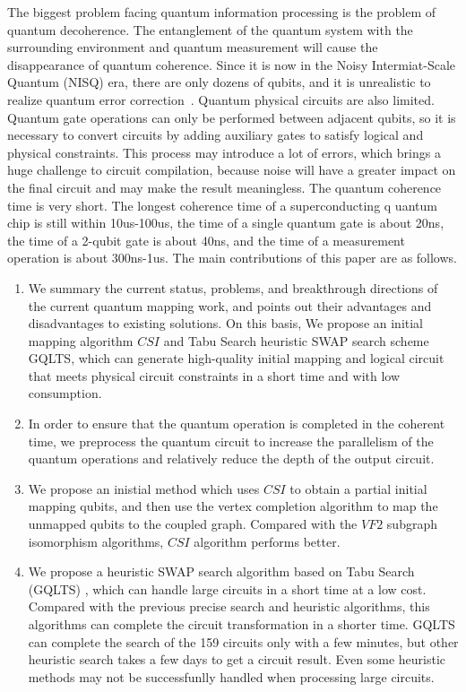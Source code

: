 \documentclass[runningheads]{llncs}
\begin{document}
The biggest problem facing quantum information processing is the problem of quantum decoherence.
The entanglement of the quantum system with the surrounding environment and quantum measurement 
will cause the disappearance of quantum coherence.
Since it is now in the Noisy Intermiat-Scale Quantum (NISQ) era, there are only dozens of qubits, 
and it is unrealistic to realize quantum error correction~\cite{2018QuantumPreskill}.
Quantum physical circuits are also limited. Quantum gate operations can only be performed between adjacent qubits, 
so it is necessary to convert circuits by adding auxiliary gates to satisfy logical and physical 
constraints. This process may introduce a lot of errors, 
which brings a huge challenge to circuit compilation, because noise will have a greater impact on the 
final circuit and may make the result meaningless.
The quantum coherence time is very short. The longest coherence time of a superconducting q
uantum chip is still within 10us-100us, 
		the time of a single quantum gate is about 20ns, 
		the time of a 2-qubit gate is about 40ns, 
		and the time of a measurement operation is about 300ns-1us.
The main contributions of this paper are as follows.
	\begin{enumerate}
		\item We summary the current status, problems, and breakthrough directions 
		of the current quantum mapping work, and points out their advantages and disadvantages 
		to existing solutions. On this basis, We propose an initial mapping algorithm
		$CSI$ and Tabu Search heuristic SWAP search scheme GQLTS,
		which can generate high-quality initial mapping and logical circuit that 
		meets physical circuit constraints in a short time and with low consumption.
		\item 
		In order to ensure that the quantum operation is completed in the coherent time,
		we preprocess the quantum circuit to increase the parallelism of the quantum operations and 
		relatively reduce the depth of the output circuit.
		\item
		 We propose an inistial method which uses $CSI$ to obtain 
		 a partial initial mapping qubits, 
		 and then use the vertex completion algorithm to map the unmapped qubits to the coupled graph. 
		 Compared with the $VF2$ subgraph isomorphism algorithms, 
		 $CSI$ algorithm performs better.
		\item We propose a heuristic SWAP search algorithm based on Tabu Search (GQLTS) , 
		which can handle large circuits in a short time at a low cost.
		Compared with the previous precise search and heuristic algorithms,
		this algorithms can complete the circuit transformation in a shorter time.
		GQLTS can complete the search of the 159 circuits only with a few minutes, 
		but other heuristic search takes a few days to get a circuit result.
		Even some heuristic methods may not be successfunlly handled when processing large circuits.
	\end{enumerate}
\end{document}
